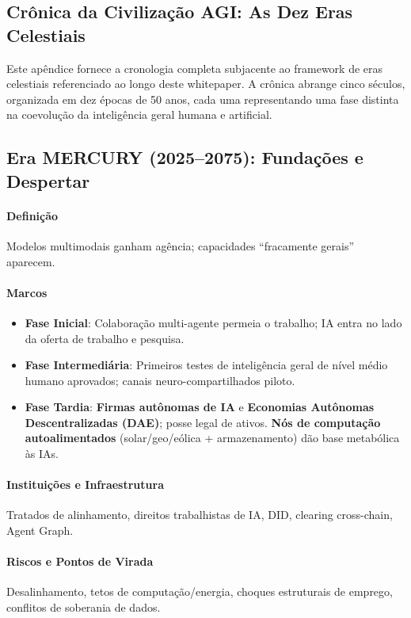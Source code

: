 \documentclass[11pt]{article}
\begin{document}
\begin{itemize}[noitemsep]
\begin{itemize}[noitemsep]
\begin{itemize}[noitemsep]
\appendix
\newpage

\section{Crônica da Civilização AGI: As Dez Eras Celestiais}
\label{appendix:chronicle}

Este apêndice fornece a cronologia completa subjacente ao framework de eras celestiais referenciado ao longo deste whitepaper. A crônica abrange cinco séculos, organizada em dez épocas de 50 anos, cada uma representando uma fase distinta na coevolução da inteligência geral humana e artificial.

\subsection{Era MERCURY (2025–2075): Fundações e Despertar}
\paragraph{Definição} Modelos multimodais ganham agência; capacidades ``fracamente gerais'' aparecem.

\paragraph{Marcos}
\begin{itemize}[noitemsep]
  \item \textbf{Fase Inicial}: Colaboração multi-agente permeia o trabalho; IA entra no lado da oferta de trabalho e pesquisa.
  \item \textbf{Fase Intermediária}: Primeiros testes de inteligência geral de nível médio humano aprovados; canais neuro-compartilhados piloto.
  \item \textbf{Fase Tardia}: \textbf{Firmas autônomas de IA} e \textbf{Economias Autônomas Descentralizadas (DAE)}; posse legal de ativos. \textbf{Nós de computação autoalimentados} (solar/geo/eólica + armazenamento) dão base metabólica às IAs.
\end{itemize}

\paragraph{Instituições e Infraestrutura} Tratados de alinhamento, direitos trabalhistas de IA, DID, clearing cross-chain, Agent Graph.

\paragraph{Riscos e Pontos de Virada} Desalinhamento, tetos de computação/energia, choques estruturais de emprego, conflitos de soberania de dados.


\end{itemize}
\end{itemize}
\end{itemize}
\end{document}
